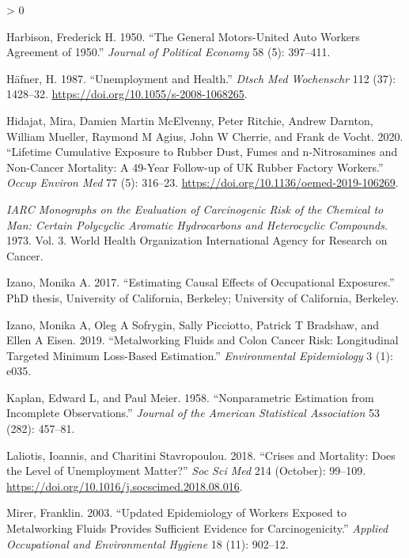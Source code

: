 \documentclass[
  11pt,
]{article}
\newlength{\cslhangindent}
\newenvironment{CSLReferences}[2] %
 {%
  \setlength{\parindent}{0pt}
  \ifodd #1 \everypar{\setlength{\hangindent}{\cslhangindent}}\ignorespaces\fi
  \ifnum #2 > 0
  \setlength{\parskip}{#2\baselineskip}
  \fi
 }%
 {}
\begin{document}
\begin{CSLReferences}{1}{0}
\leavevmode\hypertarget{ref-Harbison_1950}{}%
Harbison, Frederick H. 1950. {``The General Motors-United Auto Workers
Agreement of 1950.''} \emph{Journal of Political Economy} 58 (5):
397--411.

\leavevmode\hypertarget{ref-Hafner_1987}{}%
Häfner, H. 1987. {``Unemployment and Health.''} \emph{Dtsch Med
Wochenschr} 112 (37): 1428--32.
\url{https://doi.org/10.1055/s-2008-1068265}.

\leavevmode\hypertarget{ref-Hidajat_2020}{}%
Hidajat, Mira, Damien Martin McElvenny, Peter Ritchie, Andrew Darnton,
William Mueller, Raymond M Agius, John W Cherrie, and Frank de Vocht.
2020. {``Lifetime Cumulative Exposure to Rubber Dust, Fumes and
n-Nitrosamines and Non-Cancer Mortality: A 49-Year Follow-up of UK
Rubber Factory Workers.''} \emph{Occup Environ Med} 77 (5): 316--23.
\url{https://doi.org/10.1136/oemed-2019-106269}.

\leavevmode\hypertarget{ref-IARC_1973}{}%
\emph{IARC Monographs on the Evaluation of Carcinogenic Risk of the
Chemical to Man: Certain Polycyclic Aromatic Hydrocarbons and
Heterocyclic Compounds}. 1973. Vol. 3. World Health Organization
International Agency for Research on Cancer.

\leavevmode\hypertarget{ref-Izano_2017_thesis}{}%
Izano, Monika A. 2017. {``Estimating Causal Effects of Occupational
Exposures.''} PhD thesis, University of California, Berkeley; University
of California, Berkeley.

\leavevmode\hypertarget{ref-Izano_2019}{}%
Izano, Monika A, Oleg A Sofrygin, Sally Picciotto, Patrick T Bradshaw,
and Ellen A Eisen. 2019. {``Metalworking Fluids and Colon Cancer Risk:
Longitudinal Targeted Minimum Loss-Based Estimation.''}
\emph{Environmental Epidemiology} 3 (1): e035.

\leavevmode\hypertarget{ref-Kaplan_1958}{}%
Kaplan, Edward L, and Paul Meier. 1958. {``Nonparametric Estimation from
Incomplete Observations.''} \emph{Journal of the American Statistical
Association} 53 (282): 457--81.

\leavevmode\hypertarget{ref-Laliotis_2018}{}%
Laliotis, Ioannis, and Charitini Stavropoulou. 2018. {``Crises and
Mortality: Does the Level of Unemployment Matter?''} \emph{Soc Sci Med}
214 (October): 99--109.
\url{https://doi.org/10.1016/j.socscimed.2018.08.016}.

\leavevmode\hypertarget{ref-Mirer_2003}{}%
Mirer, Franklin. 2003. {``Updated Epidemiology of Workers Exposed to
Metalworking Fluids Provides Sufficient Evidence for Carcinogenicity.''}
\emph{Applied Occupational and Environmental Hygiene} 18 (11): 902--12.


\end{CSLReferences}
\end{document}
